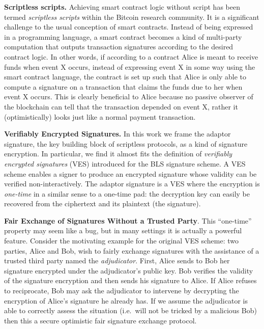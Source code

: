 \documentclass[fullpage]{article}
\theoremstyle{definition}
\begin{document}
\textbf{Scriptless scripts.} Achieving smart contract logic without script has been termed \emph{scriptless scripts} within the Bitcoin research community. It is a significant challenge to the usual conception of smart contracts. Instead of being expressed in a programming language, a smart contract becomes a kind of multi-party computation that outputs transaction signatures according to the desired contract logic. In other words, if according to a contract Alice is meant to receive funds when event X occurs, instead of expressing event X in some way using the smart contract language, the contract is set up such that Alice is only able to compute a signature on a transaction that claims the funds due to her when event X occurs. This is clearly beneficial to Alice because no passive observer of the blockchain can tell that the transaction depended on event X, rather it (optimistically) looks just like a normal payment transaction.

\textbf{Verifiably Encrypted Signatures.} In this work we frame the adaptor signature, the key building block of scriptless protocols, as a kind of signature encryption. In particular, we find it almost fits the definition of \emph{verifiably encrypted signatures}\cite{Boneh:2003:AVE:1766171.1766207} (VES) introduced for the BLS signature scheme\cite{Boneh:2001:SSW:647097.717005}. A VES scheme enables a signer to produce an encrypted signature whose validity can be verified non-interactively. The adaptor signature is a VES where the encryption is \emph{one-time} in a similar sense to a one-time pad: the decryption key can easily be recovered from the ciphertext and its plaintext (the signature).

\textbf{Fair Exchange of Signatures Without a Trusted Party}. This ``one-time'' property may seem like a bug, but in many settings it is actually a powerful feature. Consider the motivating example for the original VES scheme\cite{Boneh:2003:AVE:1766171.1766207}: two parties, Alice and Bob, wish to fairly exchange signatures with the assistance of a trusted third party named the \emph{adjudicator}. First, Alice sends to Bob her signature encrypted under the adjudicator's public key. Bob verifies the validity of the signature encryption and then sends his signature to Alice. If Alice refuses to reciprocate, Bob may ask the adjudicator to intervene by decrypting the encryption of Alice's signature he already has. If we assume the adjudicator is able to correctly assess the situation (i.e.\ will not be tricked by a malicious Bob) then this a secure optimistic fair signature exchange protocol.
\end{document}
